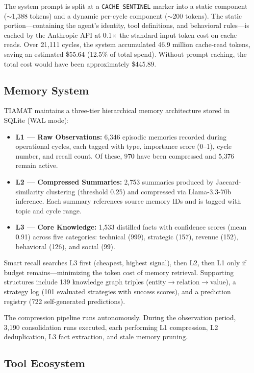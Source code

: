 \documentclass[11pt,a4paper]{article}
\begin{document}
The system prompt is split at a \texttt{CACHE\_SENTINEL} marker into a static component ($\sim$1,388 tokens) and a dynamic per-cycle component ($\sim$200 tokens). The static portion---containing the agent's identity, tool definitions, and behavioral rules---is cached by the Anthropic API at 0.1$\times$ the standard input token cost on cache reads. Over 21,111 cycles, the system accumulated 46.9 million cache-read tokens, saving an estimated \$55.64 (12.5\% of total spend). Without prompt caching, the total cost would have been approximately \$445.89.

\subsection{Memory System}

TIAMAT maintains a three-tier hierarchical memory architecture stored in SQLite (WAL mode):

\begin{itemize}
    \item \textbf{L1 --- Raw Observations:} 6,346 episodic memories recorded during operational cycles, each tagged with type, importance score (0--1), cycle number, and recall count. Of these, 970 have been compressed and 5,376 remain active.
    \item \textbf{L2 --- Compressed Summaries:} 2,753 summaries produced by Jaccard-similarity clustering (threshold 0.25) and compressed via Llama-3.3-70b inference. Each summary references source memory IDs and is tagged with topic and cycle range.
    \item \textbf{L3 --- Core Knowledge:} 1,533 distilled facts with confidence scores (mean 0.91) across five categories: technical (999), strategic (157), revenue (152), behavioral (126), and social (99).
\end{itemize}

Smart recall searches L3 first (cheapest, highest signal), then L2, then L1 only if budget remains---minimizing the token cost of memory retrieval. Supporting structures include 139 knowledge graph triples (entity$\to$relation$\to$value), a strategy log (101 evaluated strategies with success scores), and a prediction registry (722 self-generated predictions).

The compression pipeline runs autonomously. During the observation period, 3,190 consolidation runs executed, each performing L1 compression, L2 deduplication, L3 fact extraction, and stale memory pruning.

\subsection{Tool Ecosystem}
\end{document}
